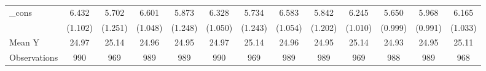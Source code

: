 {\begin{tabular}{l*{12}{c}}
\addlinespace
\_cons      &       6.432\sym{***}&       5.702\sym{***}&       6.601\sym{***}&       5.873\sym{***}&       6.328\sym{***}&       5.734\sym{***}&       6.583\sym{***}&       5.842\sym{***}&       6.245\sym{***}&       5.650\sym{***}&       5.968\sym{***}&       6.165\sym{***}\\
            &     (1.102)         &     (1.251)         &     (1.048)         &     (1.248)         &     (1.050)         &     (1.243)         &     (1.054)         &     (1.202)         &     (1.010)         &     (0.999)         &     (0.991)         &     (1.033)         \\
\midrule
Mean Y      &       24.97         &       25.14         &       24.96         &       24.95         &       24.97         &       25.14         &       24.96         &       24.95         &       25.14         &       24.93         &       24.95         &       25.11         \\
Observations&         990         &         969         &         989         &         989         &         990         &         969         &         989         &         989         &         969         &         988         &         989         &         968         \\
\bottomrule
\end{tabular}
}
